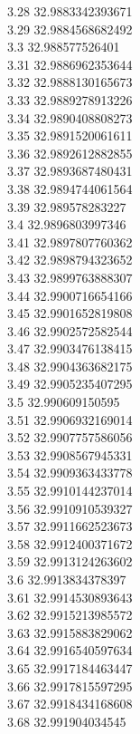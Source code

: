 {3.28	32.9883342393671\\
3.29	32.9884568682492\\
3.3	32.988577526401\\
3.31	32.9886962353644\\
3.32	32.9888130165673\\
3.33	32.9889278913226\\
3.34	32.9890408808273\\
3.35	32.9891520061611\\
3.36	32.9892612882855\\
3.37	32.9893687480431\\
3.38	32.9894744061564\\
3.39	32.989578283227\\
3.4	32.9896803997346\\
3.41	32.9897807760362\\
3.42	32.9898794323652\\
3.43	32.9899763888307\\
3.44	32.9900716654166\\
3.45	32.9901652819808\\
3.46	32.9902572582544\\
3.47	32.9903476138415\\
3.48	32.9904363682175\\
3.49	32.9905235407295\\
3.5	32.990609150595\\
3.51	32.9906932169014\\
3.52	32.9907757586056\\
3.53	32.9908567945331\\
3.54	32.9909363433778\\
3.55	32.9910144237014\\
3.56	32.9910910539327\\
3.57	32.9911662523673\\
3.58	32.9912400371672\\
3.59	32.9913124263602\\
3.6	32.9913834378397\\
3.61	32.9914530893643\\
3.62	32.9915213985572\\
3.63	32.9915883829062\\
3.64	32.9916540597634\\
3.65	32.9917184463447\\
3.66	32.9917815597295\\
3.67	32.9918434168608\\
3.68	32.991904034545\\
}
